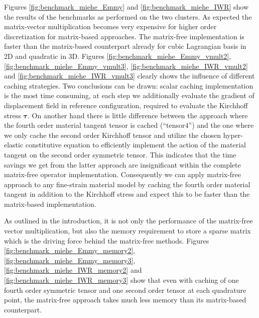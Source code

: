 \documentclass[preprint,12pt,times]{elsarticle}
\def\gz  #1{           \mbox{$\boldsymbol{#1}$}}
\begin{document}
Figures \ref{fig:benchmark_miehe_Emmy} and \ref{fig:benchmark_miehe_IWR} show the results of the benchmarks as performed on the two clusters.
As expected the matrix-vector multiplication becomes very expensive for higher order discretization for matrix-based approaches.
The matrix-free implementation is faster than the matrix-based counterpart already for cubic Lagrangian basis in 2D and quadratic in 3D.
Figures \ref{fig:benchmark_miehe_Emmy_vmult2}, \ref{fig:benchmark_miehe_Emmy_vmult3}, \ref{fig:benchmark_miehe_IWR_vmult2} and \ref{fig:benchmark_miehe_IWR_vmult3} clearly shows the influence of different caching strategies.
Two conclusions can be drawn: scalar caching implementation is the most time consuming, at each step we additionally evaluate the gradient of displacement field in reference configuration, required to evaluate the Kirchhoff stress $\gz \tau$. On another hand there is little difference between the approach where the fourth order material tangent tensor is cached (``tensor4'') and the one where we only cache the second order Kirchhoff tensor and utilize the chosen hyper-elastic constitutive equation to efficiently implement the action of the material tangent on the second order symmetric tensor.
This indicates that the time savings we get from the latter approach are insignificant within the complete matrix-free operator implementation.
Consequently we can apply matrix-free approach to any fine-strain material model by caching the fourth order material tangent in addition to the Kirchhoff stress and expect this to be faster than the matrix-based implementation.

As outlined in the introduction, it is not only the performance of the matrix-free vector multiplication, but also the memory requirement to store a sparse matrix which is the driving force behind the matrix-free methods.
Figures \ref{fig:benchmark_miehe_Emmy_memory2}, \ref{fig:benchmark_miehe_Emmy_memory3}, \ref{fig:benchmark_miehe_IWR_memory2} and \ref{fig:benchmark_miehe_IWR_memory3} show that even with caching of one fourth order symmetric tensor and one second order tensor at each quadrature point, the matrix-free approach takes much less memory than its matrix-based counterpart.
\end{document}
